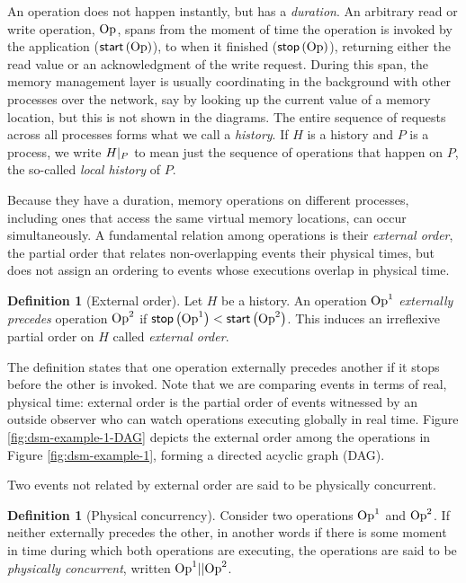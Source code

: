 \documentclass[]             %
{NASA}                       %
\theoremstyle{definition}
\newtheorem{definition}[theorem]{Definition}
\begin{document}
An operation does not happen instantly, but has a \emph{duration}. An
arbitrary read or write operation, $\mathrm{Op}$, spans from the moment of
time the operation is invoked by the application ($\mathsf{start}\left(\mathrm{Op}\right)$),
to when it finished ($\mathsf{stop}\left(\mathrm{Op}\right)$), returning either the read value
or an acknowledgment of the write request. During this span, the
memory management layer is usually coordinating in the background with
other processes over the network, say by looking up the current value
of a memory location, but this is not shown in the diagrams. The
entire sequence of requests across all processes forms what we call a
\emph{history}. If $H$ is a history and $P$ is a process, we write
$H|_{P}$ to mean just the sequence of operations that happen on $P$, the
so-called \emph{local history} of $P$.

Because they have a duration, memory operations on different
processes, including ones that access the same virtual memory
locations, can occur simultaneously. A fundamental relation among
operations is their \emph{external order}, the partial order that
relates non-overlapping events their physical times, but does not
assign an ordering to events whose executions overlap in physical
time.
\begin{definition}[External order]
  \label{def:external-order}
  Let $H$ be a history. An operation $\mathrm{Op}^1$ \emph{externally
    precedes} operation $\mathrm{Op}^2$ if
  $\mathsf{stop}\left(\mathrm{Op}^1\right) < \mathsf{start}\left(\mathrm{Op}^2\right)$. This induces an irreflexive
  partial order on $H$ called \emph{external order}.
\end{definition}
The definition states that one operation externally precedes another
if it stops before the other is invoked. Note that we are comparing
events in terms of real, physical time: external order is the partial
order of events witnessed by an outside observer who can watch
operations executing globally in real time. Figure
\ref{fig:dsm-example-1-DAG} depicts the external order among the
operations in Figure \ref{fig:dsm-example-1}, forming a directed
acyclic graph (DAG).

Two events not related by external order are said to be physically
concurrent.

\begin{definition}[Physical concurrency]
  \label{def:physical-concurrency}
  Consider two operations $\mathrm{Op}^1$ and $\mathrm{Op}^2$. If neither externally
  precedes the other, in another words if there is some moment in time
  during which both operations are executing, the operations are said
  to be \emph{physically concurrent}, written $\mathrm{Op}^1 || \mathrm{Op}^2$.
\end{definition}
\end{document}
